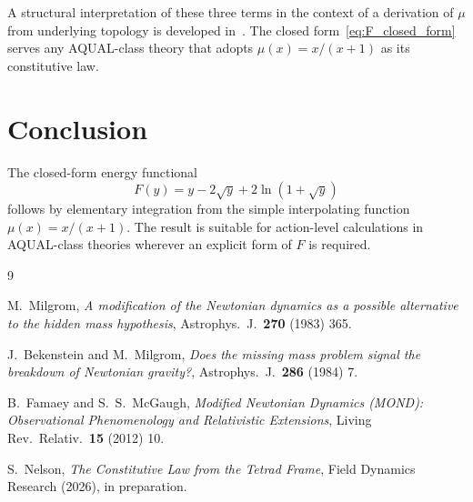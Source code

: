 \documentclass[11pt]{article}
\begin{document}
A structural interpretation of these three terms in the context of
a derivation of $\mu$ from underlying topology is developed
in~\cite{Nelson2026letter}. The closed form~\eqref{eq:F_closed_form}
serves any AQUAL-class theory that adopts $\mu(x) = x/(x+1)$ as
its constitutive law.

\section{Conclusion}

The closed-form energy functional
\begin{equation*}
  F(y) = y - 2\sqrt{y} + 2\ln(1 + \sqrt{y})
\end{equation*}
follows by elementary integration from the simple interpolating
function $\mu(x) = x/(x+1)$. The result is suitable for
action-level calculations in AQUAL-class theories wherever an
explicit form of $F$ is required.

\begin{thebibliography}{9}

M.~Milgrom,
\textit{A modification of the Newtonian dynamics as a possible
alternative to the hidden mass hypothesis},
Astrophys.\ J.\ \textbf{270} (1983) 365.

J.~Bekenstein and M.~Milgrom,
\textit{Does the missing mass problem signal the breakdown of
Newtonian gravity?},
Astrophys.\ J.\ \textbf{286} (1984) 7.

B.~Famaey and S.~S.~McGaugh,
\textit{Modified Newtonian Dynamics (MOND): Observational
Phenomenology and Relativistic Extensions},
Living Rev.\ Relativ.\ \textbf{15} (2012) 10.

S.~Nelson,
\textit{The Constitutive Law from the Tetrad Frame},
Field Dynamics Research (2026), in preparation.

\end{thebibliography}
\end{document}
